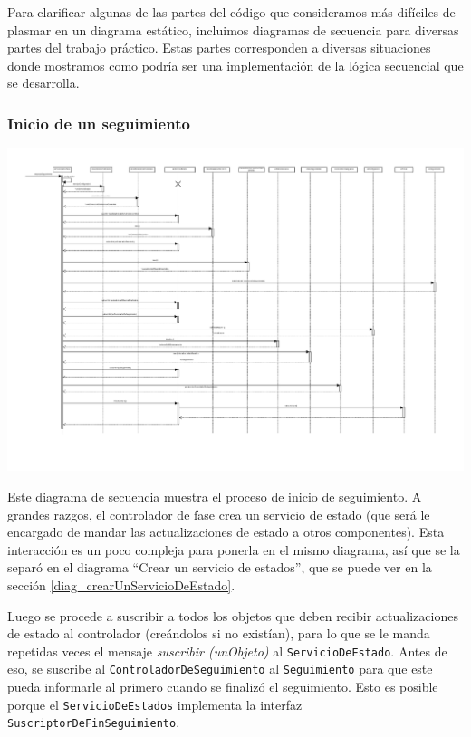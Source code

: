 
Para clarificar algunas de las partes del código que consideramos más difíciles de plasmar en un diagrama estático, incluimos diagramas de secuencia para diversas partes del trabajo práctico. Estas partes corresponden a diversas situaciones donde mostramos como podría ser una implementación de la lógica secuencial que se desarrolla.

\subsubsection{Inicio de un seguimiento}\label{diag_inicioSeguimiento}
\begin{center}
	\includegraphics[scale=0.5]{images/InicioSeguimiento.pdf}
\end{center}

Este diagrama de secuencia muestra el proceso de inicio de seguimiento. A grandes razgos, el controlador de fase crea un servicio de estado (que será le encargado de mandar las actualizaciones de estado a otros componentes). Esta interacción es un poco compleja para ponerla en el mismo diagrama, así que se la separó en el diagrama ``Crear un servicio de estados'', que se puede ver en la sección \ref{diag_crearUnServicioDeEstado}. 


Luego se procede a suscribir a todos los objetos que deben recibir actualizaciones de estado al controlador (creándolos si no existían), para lo que se le manda repetidas veces el mensaje \emph{suscribir (unObjeto)} al \texttt{ServicioDeEstado}. Antes de eso, se suscribe al \texttt{ControladorDeSeguimiento} al \texttt{Seguimiento} para que este pueda informarle al primero cuando se finalizó el seguimiento. Esto es posible porque el \texttt{ServicioDeEstados} implementa la interfaz \texttt{SuscriptorDeFinSeguimiento}.


